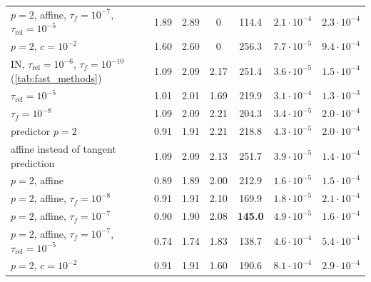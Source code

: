 \documentclass[11pt,a4paper]{article}
\theoremstyle{definition}
\theoremstyle{remark}
\begin{document}
\begin{table}[ht]
{\begin{tabular}{lcccccc}
\quad $p=2$, affine, $\tau_f=10^{-7}$, $\tau_{\mathrm{rel}}=10^{-5}$ & 1.89 & 2.89 & 0 & 114.4 & $2.1\cdot10^{-4}$ & $2.3\cdot10^{-4}$\\
\quad $p=2$, $c=10^{-2}$ & 1.60 & 2.60 & 0 & 256.3 & $7.7\cdot10^{-5}$ & $9.4\cdot10^{-4}$\\
\midrule
IN, $\tau_{\mathrm{rel}}=10^{-6}$, $\tau_f=10^{-10}$ (\cref{tab:fast_methods}) & 1.09 & 2.09 & 2.17 & 251.4 & $3.6\cdot10^{-5}$ & $1.5\cdot10^{-4}$\\
\quad $\tau_{\mathrm{rel}}=10^{-5}$ & 1.01 & 2.01 & 1.69 & 219.9 & $3.1\cdot10^{-4}$ & $1.3\cdot10^{-3}$\\
\quad $\tau_f=10^{-8}$ & 1.09 & 2.09 & 2.21 & 204.3 & $3.4\cdot10^{-5}$ & $2.0\cdot10^{-4}$\\
\quad predictor $p=2$ & 0.91 & 1.91 & 2.21 & 218.8 & $4.3\cdot10^{-5}$ & $2.0\cdot10^{-4}$\\
\quad affine instead of tangent prediction & 1.09 & 2.09 & 2.13 & 251.7 & $3.9\cdot10^{-5}$ & $1.4\cdot10^{-4}$\\
\quad $p=2$, affine & 0.89 & 1.89 & 2.00 & 212.9 & $1.6\cdot10^{-5}$ & $1.5\cdot10^{-4}$\\
\quad $p=2$, affine, $\tau_f=10^{-8}$ & 0.91 & 1.91 & 2.10 & 169.9 & $1.8\cdot10^{-5}$ & $2.1\cdot10^{-4}$\\
\quad $p=2$, affine, $\tau_f=10^{-7}$ & 0.90 & 1.90 & 2.08 & \textbf{145.0} & $4.9\cdot10^{-5}$ & $1.6\cdot10^{-4}$\\
\quad $p=2$, affine, $\tau_f=10^{-7}$, $\tau_{\mathrm{rel}}=10^{-5}$ & 0.74 & 1.74 & 1.83 & 138.7 & $4.6\cdot10^{-4}$ & $5.4\cdot10^{-4}$\\
\quad $p=2$, $c=10^{-2}$ & 0.91 & 1.91 & 1.60 & 190.6 & $8.1\cdot10^{-4}$ & $2.9\cdot10^{-4}$\\
\bottomrule
\end{tabular}}
\end{table}
\end{document}
